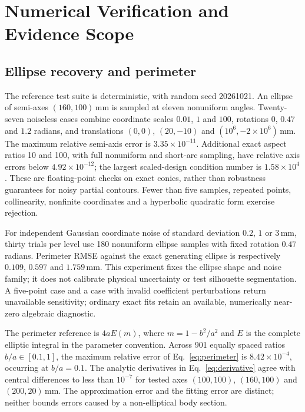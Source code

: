 \documentclass[11pt,a4paper]{article}
\begin{document}
\section{Numerical Verification and Evidence Scope}
\subsection{Ellipse recovery and perimeter}
The reference test suite is deterministic, with random seed 20261021. An ellipse of semi-axes $(160,100)$\,mm is sampled at eleven nonuniform angles. Twenty-seven noiseless cases combine coordinate scales $0.01$, $1$ and $100$, rotations $0$, $0.47$ and $1.2$ radians, and translations $(0,0)$, $(20,-10)$ and $(10^6,-2\times10^6)$\,mm. The maximum relative semi-axis error is $3.35\times10^{-11}$. Additional exact aspect ratios 10 and 100, with full nonuniform and short-arc sampling, have relative axis errors below $4.92\times10^{-12}$; the largest scaled-design condition number is $1.58\times10^4$. These are floating-point checks on exact conics, rather than robustness guarantees for noisy partial contours. Fewer than five samples, repeated points, collinearity, nonfinite coordinates and a hyperbolic quadratic form exercise rejection.

For independent Gaussian coordinate noise of standard deviation $0.2$, $1$ or $3$\,mm, thirty trials per level use 180 nonuniform ellipse samples with fixed rotation $0.47$ radians. Perimeter RMSE against the exact generating ellipse is respectively $0.109$, $0.597$ and $1.759$\,mm. This experiment fixes the ellipse shape and noise family; it does not calibrate physical uncertainty or test silhouette segmentation. A five-point case and a case with invalid coefficient perturbations return unavailable sensitivity; ordinary exact fits retain an available, numerically near-zero algebraic diagnostic.

The perimeter reference is $4aE(m)$, where $m=1-b^2/a^2$ and $E$ is the complete elliptic integral in the parameter convention. Across 901 equally spaced ratios $b/a\in[0.1,1]$, the maximum relative error of Eq.~\eqref{eq:perimeter} is $8.42\times10^{-4}$, occurring at $b/a=0.1$. The analytic derivatives in Eq.~\eqref{eq:derivative} agree with central differences to less than $10^{-7}$ for tested axes $(100,100)$, $(160,100)$ and $(200,20)$\,mm. The approximation error and the fitting error are distinct; neither bounds errors caused by a non-elliptical body section.
\end{document}
